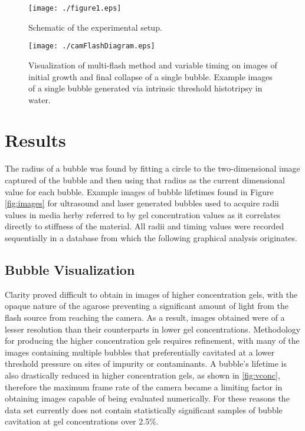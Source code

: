 \documentclass[prl,aps,epsf,twocolumn,superscriptaddress]{revtex4-1}
\begin{document}
\begin{figure}[ht!]
	\begin{center} 
		\texttt{[image: ./figure1.eps]} 
	\end{center}
	\caption{Schematic of the experimental setup.}
	\label{fig:setup}
\end{figure}

\begin{figure}[ht!]
	\begin{center} 
		\texttt{[image: ./camFlashDiagram.eps]} 
	\end{center}
	\caption{Visualization of multi-flash method and variable timing on images of initial growth and final collapse of a single bubble. Example images of a single bubble generated via intrinsic threshold histotripsy in water.}
	\label{fig:camFlash}
\end{figure}

\section{Results}
The radius of a bubble was found by fitting a circle to the two-dimensional image captured of the bubble and then using that radius as the current dimensional value for each bubble. Example images of bubble lifetimes found in Figure \ref{fig:images} for ultrasound and laser generated bubbles used to acquire radii values in media herby referred to by gel concentration values as it correlates directly to stiffness of the material. All radii and timing values were recorded sequentially in a database from which the following graphical analysis originates. 

\subsection{Bubble Visualization} \label{sec:images}

Clarity proved difficult to obtain in images of higher concentration gels, with the opaque nature of the agarose preventing a significant amount of light from the flash source from reaching the camera. As a result, images obtained were of a lesser resolution than their counterparts in lower gel concentrations. Methodology for producing the higher concentration gels requires refinement, with many of the images containing multiple bubbles that preferentially cavitated at a lower threshold pressure on sites of impurity or contaminants. A bubble's lifetime is also drastically reduced in higher concentration gels, as shown in \ref{fig:vconc}, therefore the maximum frame rate of the camera became a limiting factor in obtaining images capable of being evaluated numerically. For these reasons the data set currently does not contain statistically significant samples of bubble cavitation at gel concentrations over 2.5\%. 
\end{document}

